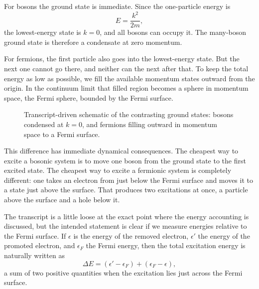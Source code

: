 For bosons the ground state is immediate. Since the one-particle energy is
\begin{equation}
E=\frac{k^2}{2m},
\end{equation}
the lowest-energy state is \(k=0\), and all bosons can occupy it. The many-boson ground state is therefore a condensate at zero momentum.

For fermions, the first particle also goes into the lowest-energy state. But the next one cannot go there, and neither can the next after that. To keep the total energy as low as possible, we fill the available momentum states outward from the origin. In the continuum limit that filled region becomes a sphere in momentum space, the Fermi sphere, bounded by the Fermi surface.

\begin{figure}
\centering
{}
\caption{Transcript-driven schematic of the contrasting ground states: bosons condensed at \(k=0\), and fermions filling outward in momentum space to a Fermi surface.}
\end{figure}

This difference has immediate dynamical consequences. The cheapest way to excite a bosonic system is to move one boson from the ground state to the first excited state. The cheapest way to excite a fermionic system is completely different: one takes an electron from just below the Fermi surface and moves it to a state just above the surface. That produces two excitations at once, a particle above the surface and a hole below it.

The transcript is a little loose at the exact point where the energy accounting is discussed, but the intended statement is clear if we measure energies relative to the Fermi surface. If \(\epsilon\) is the energy of the removed electron, \(\epsilon'\) the energy of the promoted electron, and \(\epsilon_F\) the Fermi energy, then the total excitation energy is naturally written as
\begin{equation}
\Delta E
=
(\epsilon'-\epsilon_F)+(\epsilon_F-\epsilon),
\end{equation}
a sum of two positive quantities when the excitation lies just across the Fermi surface.

